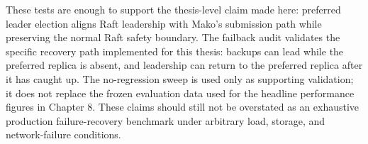 These tests are enough to support the thesis-level claim made here: preferred
leader election aligns Raft leadership with Mako's submission path while
preserving the normal Raft safety boundary. The failback audit validates the
specific recovery path implemented for this thesis: backups can lead while the
preferred replica is absent, and leadership can return to the preferred replica
after it has caught up. The no-regression sweep is used only as supporting
validation; it does not replace the frozen evaluation data used for the
headline performance figures in Chapter 8. These claims should still not be
overstated as an exhaustive production failure-recovery benchmark under
arbitrary load, storage, and network-failure conditions.
